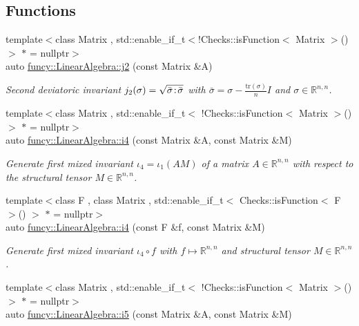 \subsection*{Functions}
\begin{DoxyCompactItemize}
\item 
{\footnotesize template$<$class Matrix , std\-::enable\-\_\-if\-\_\-t$<$!\-Checks\-::is\-Function$<$ Matrix $>$()$>$ $\ast$  = nullptr$>$ }\\auto \hyperlink{group__InvariantGroup_gadc719472ca1df9b0644bf6abc6d660e1}{funcy\-::\-Linear\-Algebra\-::j2} (const Matrix \&A)
\begin{DoxyCompactList}\small\item\em Second deviatoric invariant $ j_2(\sigma)=\sqrt{\bar\sigma\negthinspace:\negthinspace\bar\sigma} $ with $\bar\sigma = \sigma - \frac{\mathrm{tr}(\sigma)}{n}I$ and $\sigma\in\mathbb{R}^{n,n}$. \end{DoxyCompactList}\item 
{\footnotesize template$<$class Matrix , std\-::enable\-\_\-if\-\_\-t$<$ !\-Checks\-::is\-Function$<$ Matrix $>$() $>$ $\ast$  = nullptr$>$ }\\auto \hyperlink{group__InvariantGroup_gaab35bf5d54bc45e68d89fbf81392a26d}{funcy\-::\-Linear\-Algebra\-::i4} (const Matrix \&A, const Matrix \&M)
\begin{DoxyCompactList}\small\item\em Generate first mixed invariant $ \iota_4=\iota_1(AM) $ of a matrix $A\in\mathbb{R}^{n,n}$ with respect to the structural tensor $M\in\mathbb{R}^{n,n}$. \end{DoxyCompactList}\item 
{\footnotesize template$<$class F , class Matrix , std\-::enable\-\_\-if\-\_\-t$<$ Checks\-::is\-Function$<$ F $>$() $>$ $\ast$  = nullptr$>$ }\\auto \hyperlink{group__InvariantGroup_ga7b1a9eb02b3d406bc2e5e5159045d439}{funcy\-::\-Linear\-Algebra\-::i4} (const F \&f, const Matrix \&M)
\begin{DoxyCompactList}\small\item\em Generate first mixed invariant $ \iota_4\circ f $ with $f\mapsto\mathbb{R}^{n,n}$ and structural tensor $M\in\mathbb{R}^{n,n}$. \end{DoxyCompactList}\item 
{\footnotesize template$<$class Matrix , std\-::enable\-\_\-if\-\_\-t$<$ !\-Checks\-::is\-Function$<$ Matrix $>$() $>$ $\ast$  = nullptr$>$ }\\auto \hyperlink{group__InvariantGroup_ga848a942e66a1e2bd750d5e373e9a384e}{funcy\-::\-Linear\-Algebra\-::i5} (const Matrix \&A, const Matrix \&M)

\end{DoxyCompactItemize}
